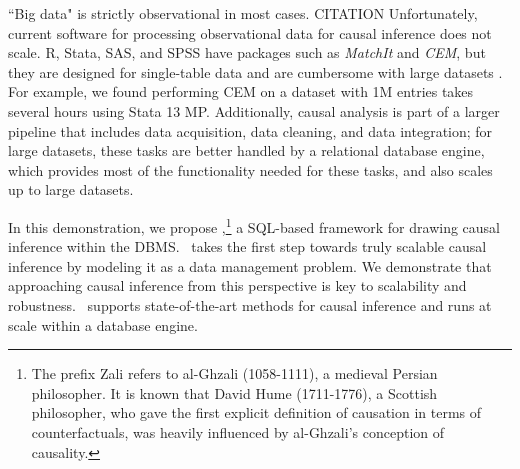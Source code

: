 ``Big data" is strictly observational in most cases.
CITATION
Unfortunately, current software for processing observational data for causal inference does not scale.
R, Stata, SAS, and SPSS have packages such as {\em MatchIt} and {\em CEM}, but they are designed for single-table data and are cumbersome with large datasets \cite{ho2005,iacus2009cem}. 
For example, we found performing CEM on a dataset with 1M entries takes several hours using Stata 13 MP.
 Additionally, causal analysis is part of a larger pipeline that includes data acquisition, data cleaning, and data integration; for large datasets, these tasks are better handled by a relational database engine, which provides most of the functionality needed for these tasks, and also scales up to large datasets. %


In this demonstration, we propose \GSQL,\footnote{ The prefix Zali refers to
  al-Ghzali (1058-1111), a medieval Persian philosopher. It is known
  that David Hume (1711-1776), a Scottish philosopher, who gave the
  first explicit definition of causation in terms of counterfactuals,
  was heavily influenced by al-Ghzali's conception of causality.}
  a SQL-based framework for drawing causal inference within the DBMS. \GSQL\ takes the first step towards truly scalable causal inference by modeling it as a data management problem. We demonstrate that
   approaching causal inference from this perspective is key to scalability and robustness.  \GSQL\ supports state-of-the-art methods for causal inference and runs at scale within a database engine.  

